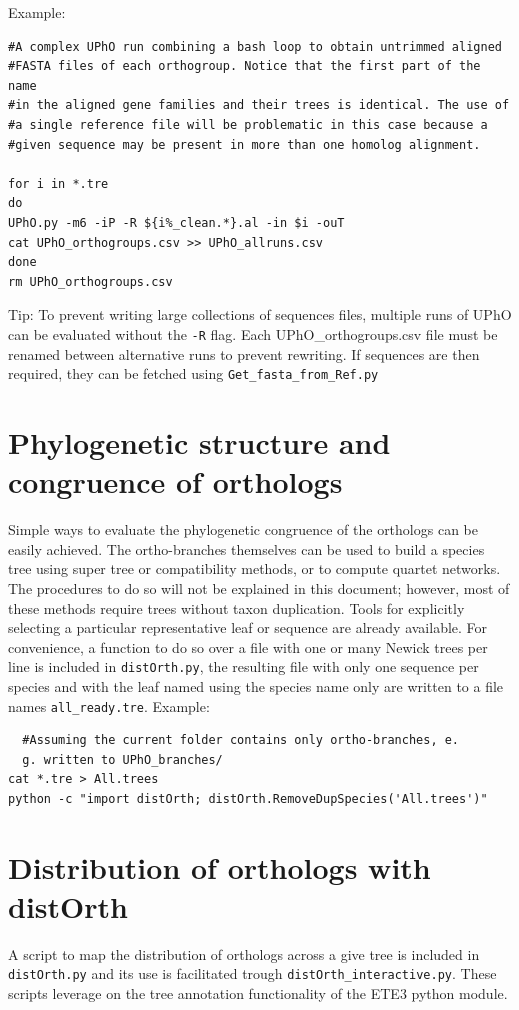 \documentclass[10pt]{article}
\begin{document}
Example:

\begin{lstlisting} 
#A complex UPhO run combining a bash loop to obtain untrimmed aligned
#FASTA files of each orthogroup. Notice that the first part of the name
#in the aligned gene families and their trees is identical. The use of
#a single reference file will be problematic in this case because a
#given sequence may be present in more than one homolog alignment.

for i in *.tre 
do 
UPhO.py -m6 -iP -R ${i%_clean.*}.al -in $i -ouT 
cat UPhO_orthogroups.csv >> UPhO_allruns.csv 
done 
rm UPhO_orthogroups.csv

\end{lstlisting}

Tip: To prevent writing large collections of sequences files, multiple
runs of UPhO can be evaluated without the \texttt{-R} flag. Each
UPhO\_orthogroups.csv file must be renamed between alternative runs to
prevent rewriting. If sequences are then required, they can be fetched 
using \texttt{Get\_fasta\_from\_Ref.py}

\section{Phylogenetic structure and congruence of orthologs} Simple
ways to evaluate the phylogenetic congruence of the orthologs can be
easily achieved. The ortho-branches themselves can be used to build a
species tree using super tree or compatibility methods, or to compute quartet networks.
 The procedures to do so will not  be explained in this document; however,  most of these methods require trees
 without taxon duplication. Tools for explicitly selecting a
particular representative leaf or sequence are already available. For
convenience, a function to do so over a file with one or many Newick trees
per line is included in \texttt{distOrth.py}, the resulting file with
only one sequence per species and with the leaf named using the
species name only are written to a file names \texttt{all\_ready.tre}.
Example:

\begin{lstlisting} 
  #Assuming the current folder contains only ortho-branches, e.
  g. written to UPhO_branches/ 
cat *.tre > All.trees
python -c "import distOrth; distOrth.RemoveDupSpecies('All.trees')"
\end{lstlisting}

\section{Distribution of orthologs with distOrth} A script
to map the distribution of orthologs across a give tree is included in
\texttt{distOrth.py} and its use is facilitated trough
\texttt{distOrth\_interactive.py}. These scripts leverage on the tree
annotation functionality of the ETE3 python module.
\end{document}
